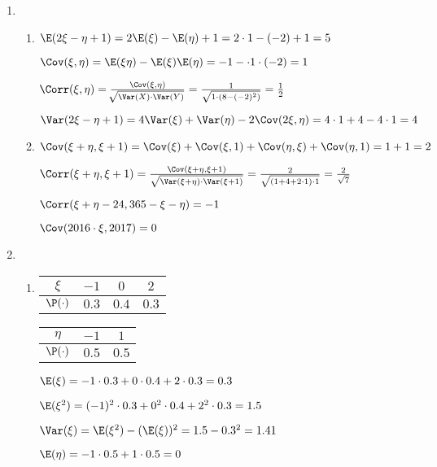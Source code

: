 \begin{enumerate}
\item \begin{enumerate}
\item $\E (2\xi - \eta +1) = 2 \E (\xi) - \E (\eta) + 1 = 2\cdot 1 - (-2) + 1 = 5 $

$\Cov (\xi, \eta) = \E (\xi \eta) - \E(\xi) \E(\eta) = -1 - \cdot 1 \cdot (-2) = 1$

$\Corr (\xi, \eta) = \frac{\Cov(\xi, \eta)}{\sqrt[]{\Var(X) \cdot \Var(Y)}} = \frac{1}{\sqrt{1 \cdot (8-(-2)^2)}} = \frac{1}{2}$

$\Var (2\xi - \eta + 1) = 4\Var(\xi) + \Var(\eta) - 2 \Cov (2\xi, \eta) = 4 \cdot 1 + 4 - 4 \cdot 1 = 4$

\item $\Cov(\xi + \eta, \xi + 1) = \Cov(\xi) + \Cov(\xi, 1) + \Cov(\eta, \xi) + \Cov(\eta, 1) = 1 +1 = 2$

$\Corr(\xi + \eta , \xi + 1) = \frac{\Cov(\xi + \eta , \xi + 1)}{\sqrt{\Var(\xi + \eta)\cdot \Var (\xi + 1)}} = \frac{2}{\sqrt{(1+4+2\cdot 1) \cdot 1}} = \frac{2}{\sqrt{7}}$

$\Corr(\xi + \eta - 24, 365 - \xi - \eta) = -1$

$\Cov(2016\cdot \xi, 2017) = 0$

\end{enumerate}
\item \begin{enumerate}
\item \begin{tabular}{cccc}
\toprule
$\xi$ & $-1$ & $0$ & $2$ \\ \midrule
$\P(\cdot)$ & $0.3$ & $0.4$ & $0.3$ \\ \bottomrule
\end{tabular}
\hspace{1cm}
\begin{tabular}{ccc}
\toprule
$\eta$ & $-1$ & $1$ \\ \midrule
$\P(\cdot)$ & $0.5$ & $0.5$ \\ \bottomrule
\end{tabular}

$\E(\xi) = -1 \cdot 0.3 + 0 \cdot 0.4 + 2 \cdot 0.3 = 0.3$

$\E (\xi^2) = (-1)^2 \cdot 0.3 + 0^2 \cdot 0.4 + 2^2 \cdot 0.3 = 1.5$

$\Var(\xi) = \E(\xi^2) - (\E(\xi))^2 = 1.5 - 0.3^2 = 1.41$

$\E(\eta) = -1 \cdot 0.5 + 1 \cdot 0.5 = 0$


\end{enumerate}
\end{enumerate}
